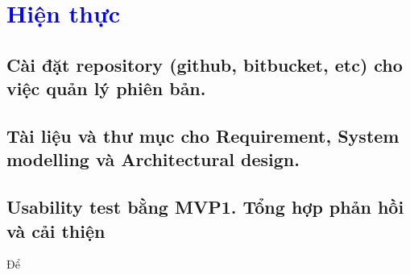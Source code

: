 \section{\textcolor{blue}{Hiện thực}} 
\subsection{Cài đặt repository (github, bitbucket, etc) cho việc quản lý phiên bản.}
\subsection{Tài liệu và thư mục cho Requirement, System modelling và Architectural design.}
\subsection{Usability test bằng MVP1. Tổng hợp phản hồi và cải thiện}
Để 